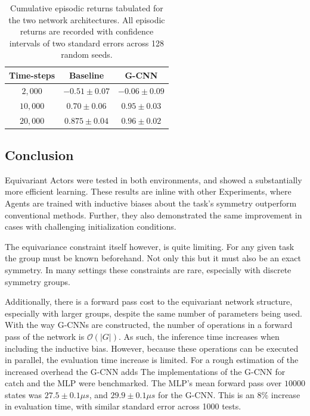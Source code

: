 \begin{table}
	\centering
	\begin{tabular}{|c|c|c|}
		\hline
		Time-steps & Baseline         & G-CNN                     \\
		\hline
		$2, 000$   & $- 0.51\pm 0.07$ & $\mathbf{-0.06 \pm 0.09}$ \\
		$10, 000$  & $0.70 \pm 0.06$  & $\mathbf{0.95 \pm 0.03} $ \\
		$20,000$   & $0.875 \pm 0.04$ & $\mathbf{0.96\pm 0.02}$   \\
		\hline
	\end{tabular}
	\caption{Cumulative episodic returns tabulated for the two network architectures. All episodic returns are recorded with confidence intervals of two standard errors across 128 random seeds.}
	\label{tab:actor-critic_catch}
\end{table}
\subsection{Conclusion}
Equivariant Actors were tested in both environments, and showed a substantially more efficient learning. These results are inline with other Experiments, where Agents are trained with inductive biases about the task's symmetry outperform conventional methods. Further, they also demonstrated the same improvement in cases with challenging initialization conditions.

The equivariance constraint itself however, is quite limiting. For any given task the group must be known beforehand. Not only this but it must also be an exact symmetry. In many settings these constraints are rare, especially with discrete symmetry groups.

Additionally, there is a forward pass cost to the equivariant network structure, especially with larger groups, despite the same number of parameters being used. With the way G-CNNs are constructed, the number of operations in a forward pass of the network is $\mathcal{O}(|G|)$. As such, the inference time increases when including the inductive bias. However, because these operations can be executed in parallel, the evaluation time increase is limited. For a rough estimation of the increased overhead the G-CNN adds The implementations of the G-CNN for catch and the MLP were benchmarked. The MLP's mean forward pass over $10000$ states was $27.5 \pm 0.1\mu s$, and $29.9 \pm 0.1 \mu s$ for the G-CNN. This is an $8\%$ increase in evaluation time, with similar standard error across 1000 tests.

